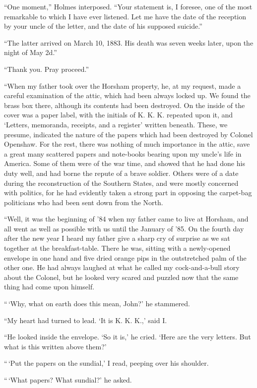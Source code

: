 “One moment,” Holmes interposed. “Your statement is,
I foresee, one of the most remarkable to which I have ever
listened. Let me have the date of the reception by your uncle
of the letter, and the date of his supposed suicide.”

“The latter arrived on March 10, 1883. His death was
seven weeks later, upon the night of May 2d.”

“Thank you. Pray proceed.”

“When my father took over the Horsham property, he, at
my request, made a careful examination of the attic, which
had been always locked up. We found the brass box there,
although its contents had been destroyed. On the inside of
the cover was a paper label, with the initials of K. K. K. repeated
upon it, and ‘Letters, memoranda, receipts, and a register’
written beneath. These, we presume, indicated the
nature of the papers which had been destroyed by Colonel
Openshaw. For the rest, there was nothing of much importance
in the attic, save a great many scattered papers and
note-books bearing upon my uncle’s life in America. Some of
them were of the war time, and showed that he had done his
duty well, and had borne the repute of a brave soldier. Others
were of a date during the reconstruction of the Southern
States, and were mostly concerned with politics, for he had
evidently taken a strong part in opposing the carpet-bag politicians
who had been sent down from the North.

“Well, it was the beginning of ’84 when my father came to
live at Horsham, and all went as well as possible with us until
the January of ’85. On the fourth day after the new year I
heard my father give a sharp cry of surprise as we sat together
at the breakfast-table. There he was, sitting with a
newly-opened envelope in one hand and five dried orange pips
in the outstretched palm of the other one. He had always
laughed at what he called my cock-and-a-bull story about the
Colonel, but he looked very scared and puzzled now that the
same thing had come upon himself.

“\,‘Why, what on earth does this mean, John?’ he
stammered.

“My heart had turned to lead. ‘It is K. K. K.,’ said I.

“He looked inside the envelope. ‘So it is,’ he cried.
‘Here are the very letters. But what is this written above
them?’

“\,‘Put the papers on the sundial,’ I read, peeping over his
shoulder.

“\,‘What papers? What sundial?’ he asked.

